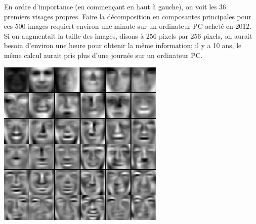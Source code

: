 \begin{adjmulticols}{1}{0in}{-2in}
\begin{center}
\begin{minipage}{0.9\textwidth}
En ordre d'importance (en commençant en haut à gauche), on voit
les 36 premiers visages propres.   Faire la décomposition en composantes principales
pour ces 500 images
requiert environ une minute sur un ordinateur PC acheté en 2012.  Si on augmentait 
la taille des images, disons à 256 pixels par 256 pixels, on aurait besoin d'environ
une heure pour obtenir la même information; il y a 10 ans, le même calcul aurait pris plus
d'une journée sur un ordinateur PC.
\end{minipage}
\hfill
\begin{minipage}{0.45\textwidth}
\includegraphics[width=\linewidth]{./images/faces_propres}
\end{minipage}
\end{center}



\end{adjmulticols}
